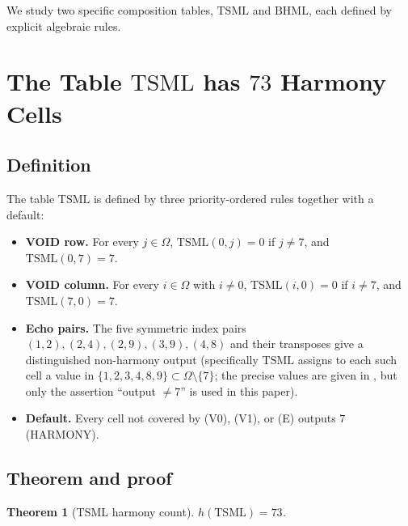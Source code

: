 \documentclass[11pt,reqno]{amsart}
\theoremstyle{plain}
\newtheorem{theorem}{Theorem}
\theoremstyle{definition}
\theoremstyle{remark}
\newcommand{\TSML}{\mathrm{TSML}}
\newcommand{\BHML}{\mathrm{BHML}}
\begin{document}
We study two specific composition tables, $\TSML$ and $\BHML$,
each defined by explicit algebraic rules.

\section{The Table $\TSML$ has $73$ Harmony Cells}\label{sec:tsml}

\subsection{Definition}

The table $\TSML$ is defined by three priority-ordered rules
together with a default:

\begin{itemize}
\item[(V0)] \textbf{VOID row.} For every $j \in \Omega$,
$\TSML(0, j) = 0$ if $j \ne 7$, and $\TSML(0, 7) = 7$.
\item[(V1)] \textbf{VOID column.} For every $i \in \Omega$ with
$i \ne 0$, $\TSML(i, 0) = 0$ if $i \ne 7$, and $\TSML(7, 0) = 7$.
\item[(E)] \textbf{Echo pairs.} The five symmetric index pairs
$(1,2), (2,4), (2,9), (3,9), (4,8)$ and their transposes give a
distinguished non-harmony output (specifically $\TSML$ assigns to
each such cell a value in $\{1, 2, 3, 4, 8, 9\} \subset \Omega
\setminus \{7\}$; the precise values are given in
\cite{ck_tables}, but only the assertion ``output $\ne 7$'' is
used in this paper).
\item[(D)] \textbf{Default.} Every cell not covered by (V0), (V1),
or (E) outputs $7$ (HARMONY).
\end{itemize}

\subsection{Theorem and proof}

\begin{theorem}[$\TSML$ harmony count]\label{thm:tsml}
$h(\TSML) = 73$.
\end{theorem}
\end{document}
